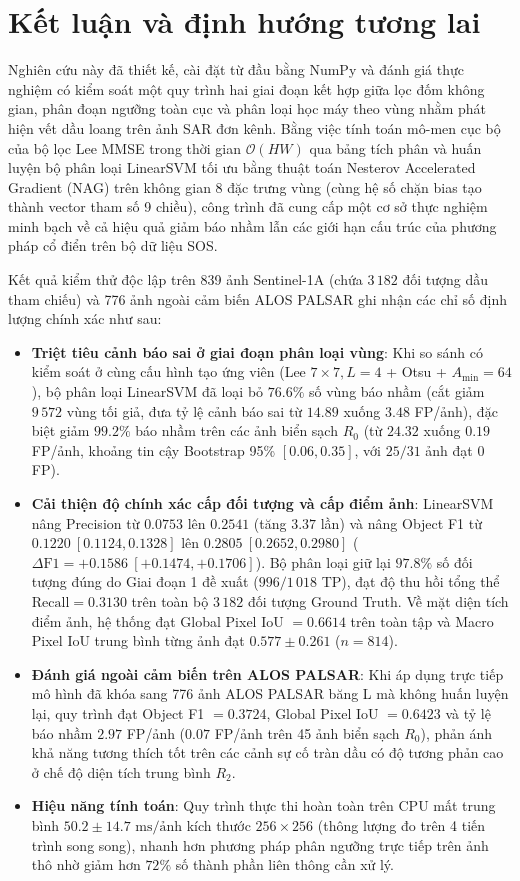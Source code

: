 \section{Kết luận và định hướng tương lai}
\label{sec:conclusion}

Nghiên cứu này đã thiết kế, cài đặt từ đầu bằng NumPy và đánh giá thực nghiệm có kiểm soát một quy trình hai giai đoạn kết hợp giữa lọc đốm không gian, phân đoạn ngưỡng toàn cục và phân loại học máy theo vùng nhằm phát hiện vết dầu loang trên ảnh SAR đơn kênh. Bằng việc tính toán mô-men cục bộ của bộ lọc Lee MMSE trong thời gian $\mathcal{O}(HW)$ qua bảng tích phân và huấn luyện bộ phân loại LinearSVM tối ưu bằng thuật toán Nesterov Accelerated Gradient (NAG) trên không gian 8 đặc trưng vùng (cùng hệ số chặn bias tạo thành vector tham số 9 chiều), công trình đã cung cấp một cơ sở thực nghiệm minh bạch về cả hiệu quả giảm báo nhầm lẫn các giới hạn cấu trúc của phương pháp cổ điển trên bộ dữ liệu SOS.

Kết quả kiểm thử độc lập trên 839 ảnh Sentinel-1A (chứa $3\,182$ đối tượng dầu tham chiếu) và 776 ảnh ngoài cảm biến ALOS PALSAR ghi nhận các chỉ số định lượng chính xác như sau:
\begin{itemize}
    \item \textbf{Triệt tiêu cảnh báo sai ở giai đoạn phân loại vùng}: Khi so sánh có kiểm soát ở cùng cấu hình tạo ứng viên (Lee $7 \times 7, L=4$ + Otsu + $A_{\min} = 64$), bộ phân loại LinearSVM đã loại bỏ $76.6\%$ số vùng báo nhầm (cắt giảm $9\,572$ vùng tối giả, đưa tỷ lệ cảnh báo sai từ $14.89$ xuống $3.48$ FP/ảnh), đặc biệt giảm $99.2\%$ báo nhầm trên các ảnh biển sạch $R_0$ (từ $24.32$ xuống $0.19$ FP/ảnh, khoảng tin cậy Bootstrap 95\% $[0.06, 0.35]$, với $25/31$ ảnh đạt $0$ FP).
    \item \textbf{Cải thiện độ chính xác cấp đối tượng và cấp điểm ảnh}: LinearSVM nâng Precision từ $0.0753$ lên $0.2541$ (tăng $3.37$ lần) và nâng Object F1 từ $0.1220 \ [0.1124, 0.1328]$ lên $0.2805 \ [0.2652, 0.2980]$ ($\Delta\text{F1} = +0.1586 \ [+0.1474, +0.1706]$). Bộ phân loại giữ lại $97.8\%$ số đối tượng đúng do Giai đoạn 1 đề xuất ($996/1\,018$ TP), đạt độ thu hồi tổng thể $\text{Recall} = 0.3130$ trên toàn bộ $3\,182$ đối tượng Ground Truth. Về mặt diện tích điểm ảnh, hệ thống đạt Global Pixel IoU $= 0.6614$ trên toàn tập và Macro Pixel IoU trung bình từng ảnh đạt $0.577 \pm 0.261$ ($n = 814$).
    \item \textbf{Đánh giá ngoài cảm biến trên ALOS PALSAR}: Khi áp dụng trực tiếp mô hình đã khóa sang 776 ảnh ALOS PALSAR băng L mà không huấn luyện lại, quy trình đạt Object F1 $= 0.3724$, Global Pixel IoU $= 0.6423$ và tỷ lệ báo nhầm $2.97$ FP/ảnh ($0.07$ FP/ảnh trên 45 ảnh biển sạch $R_0$), phản ánh khả năng tương thích tốt trên các cảnh sự cố tràn dầu có độ tương phản cao ở chế độ diện tích trung bình $R_2$.
    \item \textbf{Hiệu năng tính toán}: Quy trình thực thi hoàn toàn trên CPU mất trung bình $50.2 \pm 14.7\text{ ms/ảnh}$ kích thước $256 \times 256$ (thông lượng đo trên 4 tiến trình song song), nhanh hơn phương pháp phân ngưỡng trực tiếp trên ảnh thô nhờ giảm hơn $72\%$ số thành phần liên thông cần xử lý.
\end{itemize}

